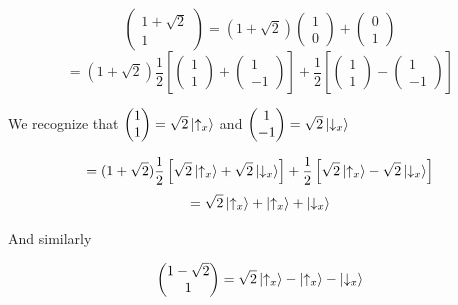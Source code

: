 \documentclass[a4paper,norsk, 10pt]{article}
\begin{document}
\begin{equation}
\begin{pmatrix}
1 + \sqrt{2} \\ 1
\end{pmatrix}
= (1+\sqrt{2})
\begin{pmatrix}
1\\0
\end{pmatrix}
+
\begin{pmatrix}
0\\1
\end{pmatrix}
\end{equation}
\begin{equation}
=(1+\sqrt{2})
\frac{1}{2}\left[
\begin{pmatrix}
1\\1
\end{pmatrix}
+\begin{pmatrix}
1\\-1
\end{pmatrix}
\right]
+
\frac{1}{2}
\left[
\begin{pmatrix}
1\\1
\end{pmatrix}
-\begin{pmatrix}
1\\-1
\end{pmatrix}
\right]
\end{equation}


We recognize that $\begin{pmatrix} 1\\1 \end{pmatrix} = \sqrt{2}\ket{\uparrow_x}$ and $\begin{pmatrix} 1\\-1 \end{pmatrix} = \sqrt{2}\ket{\downarrow_x}$


\begin{equation}
= (1+\sqrt{2})
\frac{1}{2}\left[
\sqrt{2}\ket{\uparrow_x}
+\sqrt{2}\ket{\downarrow_x}
\right]
+
\frac{1}{2}
\left[
\sqrt{2}\ket{\uparrow_x}
-\sqrt{2}\ket{\downarrow_x}
\right]
\end{equation}
\begin{equation}
= \sqrt{2}\ket{\uparrow_x} + \ket{\uparrow_x} + \ket{\downarrow_x}
\end{equation}

And similarly

\begin{equation}
\begin{pmatrix}
1 - \sqrt{2} \\ 1
\end{pmatrix}
= \sqrt{2}\ket{\uparrow_x} - \ket{\uparrow_x} - \ket{\downarrow_x}
\end{equation}
\end{document}
